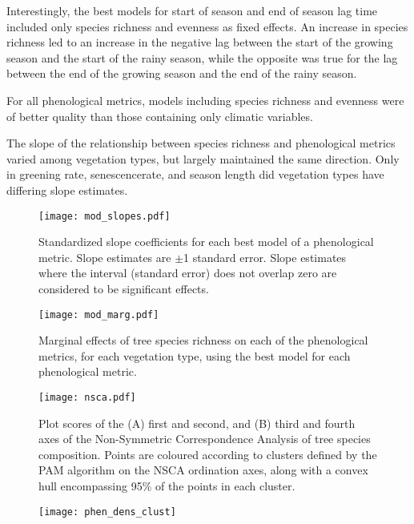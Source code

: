 \documentclass[11pt,a4paper]{article}
\begin{document}
Interestingly, the best models for start of season and end of season lag time included only species richness and evenness as fixed effects. An increase in species richness led to an increase in the negative lag between the start of the growing season and the start of the rainy season, while the opposite was true for the lag between the end of the growing season and the end of the rainy season. 

For all phenological metrics, models including species richness and evenness were of better quality than those containing only climatic variables.  

The slope of the relationship between species richness and phenological metrics varied among vegetation types, but largely maintained the same direction. Only in greening rate, senescencerate, and season length did vegetation types have differing slope estimates.



 

\begin{figure}[h]
\centering
	\texttt{[image: mod\_slopes.pdf]}
	\caption{Standardized slope coefficients for each best model of a phenological metric. Slope estimates are $\pm$1 standard error. Slope estimates where the interval (standard error) does not overlap zero are considered to be significant effects.}
	\label{mod_slopes}
\end{figure}

\begin{figure}[h]
\centering
	\texttt{[image: mod\_marg.pdf]}
	\caption{Marginal effects of tree species richness on each of the phenological metrics, for each vegetation type, using the best model for each phenological metric.}
	\label{mod_marg}
\end{figure}

\begin{figure}[h]
\centering
	\texttt{[image: nsca.pdf]}
	\caption{Plot scores of the (A) first and second, and (B) third and fourth axes of the Non-Symmetric Correspondence Analysis of tree species composition. Points are coloured according to clusters defined by the PAM algorithm on the NSCA ordination axes, along with a convex hull encompassing 95\% of the points in each cluster.}
	\label{nsca}
\end{figure}

\begin{figure}[h]
\centering
	\texttt{[image: phen\_dens\_clust]}
	\caption{}
	\label{phen_dens_clust}
\end{figure}
\end{document}
